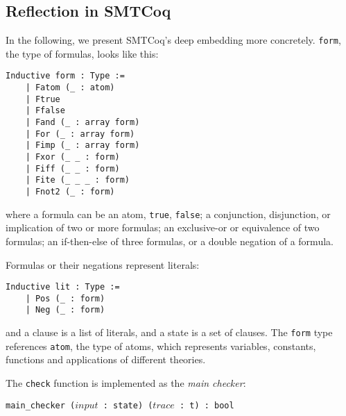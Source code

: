 \documentclass{article}
\begin{document}
	\subsection{Reflection in SMTCoq}
	In the following, we present SMTCoq's 
	deep embedding more concretely. 
	\texttt{form}, the type of formulas, 
	looks like this:
	\begin{verbatim}
Inductive form : Type :=
	| Fatom (_ : atom)
	| Ftrue
	| Ffalse
	| Fand (_ : array form)
	| For (_ : array form)
	| Fimp (_ : array form)
	| Fxor (_ _ : form)
	| Fiff (_ _ : form)
	| Fite (_ _ _ : form)
	| Fnot2 (_ : form)
	\end{verbatim}
	where a formula can be an atom, 
	\texttt{true}, \texttt{false};
	a conjunction, disjunction, or 
	implication of two or more 
	formulas; an exclusive-or or
	equivalence of two formulas; 
	an if-then-else of three formulas, 
	or a double negation of a formula.
	
	Formulas or their negations 
	represent literals:
	\begin{verbatim}
Inductive lit : Type :=
	| Pos (_ : form)
	| Neg (_ : form)
	\end{verbatim}
	and a clause is a list of literals,
	and a state is a set of clauses.
	The \texttt{form} type references 
	\texttt{atom}, the type of atoms, 
	which represents variables, 
	constants, functions and 
	applications of different theories.
	
	\noindent The \texttt{check} 
	function is implemented as the 
	\textit{main checker}: 
	\begin{center}
		\texttt{main\_checker ($input$ : 
			state) ($trace$ : t) : bool}	
	\end{center}
	
\end{document}
